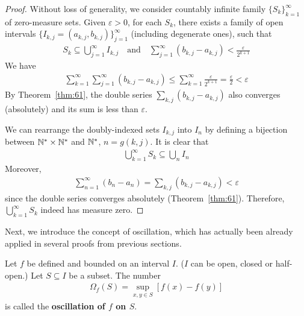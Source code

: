 \documentclass[thmcnt=section, 12pt]{my-elegantbook}
\begin{document}
\begin{proof}
	Without loss of generality,
	we consider countably infinite family 
	$\{S_k\}_{k=1}^\infty$
	of zero-measure sets.
	Given $\varepsilon > 0$,
	for each $S_k$,
	there exists a family of open intervals
	$\{I_{k,j} = (a_{k,j}, b_{k,j})\}_{j=1}^\infty$
	(including degenerate ones),
	such that 
	\begin{align*}
		S_k \subseteq \bigcup_{j=1}^\infty I_{k,j}
		\quad \text{and} \quad 
		\sum_{j=1}^\infty (b_{k,j} - a_{k,j}) 
		< \frac{\varepsilon}{2^{k+1}}
	\end{align*}
	We have 
	\begin{align*}
		\sum_{k=1}^\infty \sum_{j=1}^\infty 
		(b_{k,j} - a_{k,j})
		\leq \sum_{k=1}^\infty \frac{\varepsilon}{2^{k+1}}
		= \frac{\varepsilon}{2}
		< \varepsilon
	\end{align*}
	By Theorem~\ref{thm:61},
	the double series $\sum_{k,j} (b_{k,j} - a_{k,j})$
	also converges (absolutely) and its sum is less than $\varepsilon$.

	We can rearrange the doubly-indexed sets $I_{k,j}$ into 
	$I_n$ by defining a bijection between $\mathbb{N}^\ast \times \mathbb{N}^\ast$
	and $\mathbb{N}^\ast$, $n = g(k,j)$.
	It is clear that 
	\begin{align*}
		\bigcup_{k=1}^\infty S_k 
		\subseteq \bigcup_{n} I_{n}
	\end{align*}
	Moreover,
	\begin{align*}
		\sum_{n=1}^\infty (b_n - a_n)
		= \sum_{k,j} (b_{k,j} - a_{k,j})
		< \varepsilon
	\end{align*}
	since the double series converges absolutely (Theorem~\ref{thm:61}).
	Therefore, $\bigcup_{k=1}^\infty S_k$ indeed has measure zero.
\end{proof}


Next, we introduce the concept of oscillation, 
which has actually been already applied
in several proofs from previous sections.

\begin{definition} \label{def:7}
	Let $f$ be defined and bounded on an interval $I$.
	($I$ can be open, closed or half-open.)
	Let $S \subseteq I$ be a subset.
	The number
	\begin{align*}
		\Omega_f (S)
		= \sup_{x,y \in S} [f(x) - f(y)]
	\end{align*}
	is called the \textbf{oscillation of $f$ on $S$}.
\end{definition}
\end{document}
